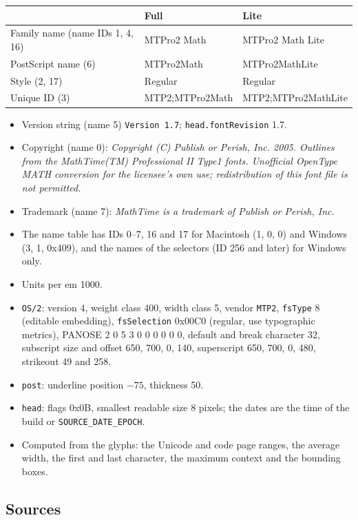 \documentclass[10pt]{article}
\newcommand\code[1]{\texttt{#1}}
\begin{document}
\begin{center}
\begin{tabular}{lll}
\toprule
& Full & Lite \\
\midrule
Family name (name IDs 1, 4, 16) & MTPro2 Math & MTPro2 Math Lite \\
PostScript name (6) & MTPro2Math & MTPro2MathLite \\
Style (2, 17) & Regular & Regular \\
Unique ID (3) & MTP2;MTPro2Math & MTP2;MTPro2MathLite \\
\bottomrule
\end{tabular}
\end{center}

\begin{itemize}
\item Version string (name 5) \code{Version 1.7};
  \code{head.fontRevision} 1.7.
\item Copyright (name 0): \emph{Copyright (C) Publish or Perish, Inc.
  2005.  Outlines from the MathTime(TM) Professional II Type1 fonts.
  Unofficial OpenType MATH conversion for the licensee's own use;
  redistribution of this font file is not permitted.}
\item Trademark (name 7): \emph{MathTime is a trademark of Publish or
  Perish, Inc.}
\item The name table has IDs 0--7, 16 and 17 for Macintosh (1, 0, 0)
  and Windows (3, 1, 0x409), and the names of the selectors (ID 256
  and later) for Windows only.
\item Units per em 1000.
\item \code{OS/2}: version 4, weight class 400, width class 5, vendor
  \code{MTP2}, \code{fsType} 8 (editable embedding), \code{fsSelection}
  0x00C0 (regular, use typographic metrics), PANOSE 2 0 5 3 0 0 0 0 0
  0, default and break character 32, subscript size and offset 650,
  700, 0, 140, superscript 650, 700, 0, 480, strikeout 49 and 258.
\item \code{post}: underline position $-75$, thickness 50.
\item \code{head}: flags 0x0B, smallest readable size 8 pixels; the
  dates are the time of the build or \code{SOURCE\_DATE\_EPOCH}.
\item Computed from the glyphs: the Unicode and code page ranges, the
  average width, the first and last character, the maximum context and
  the bounding boxes.
\end{itemize}

\subsection{Sources}
\end{document}
